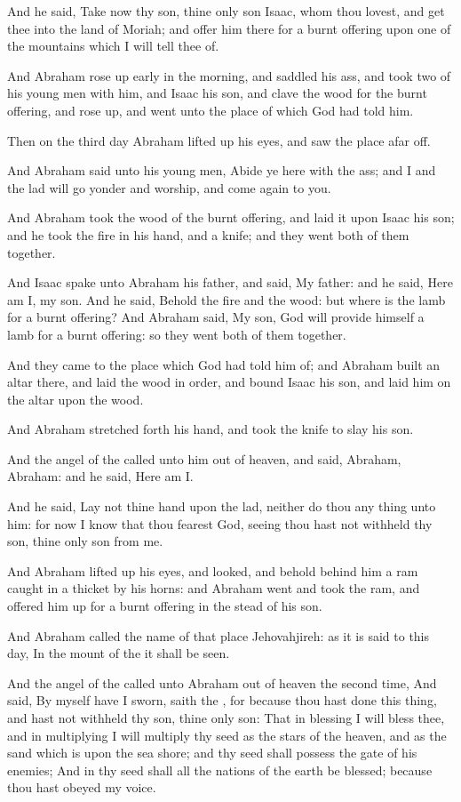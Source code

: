 \verse And he said, Take now thy son, thine only son Isaac, whom thou lovest, and get thee into the land of Moriah; and offer him there for a burnt offering upon one of the mountains which I will tell thee of.

\verse And Abraham rose up early in the morning, and saddled his ass, and took two of his young men with him, and Isaac his son, and clave the wood for the burnt offering, and rose up, and went unto the place of which God had told him.

\verse Then on the third day Abraham lifted up his eyes, and saw the place afar off.

\verse And Abraham said unto his young men, Abide ye here with the ass; and I and the lad will go yonder and worship, and come again to you.

\verse And Abraham took the wood of the burnt offering, and laid it upon Isaac his son; and he took the fire in his hand, and a knife; and they went both of them together.

\verse And Isaac spake unto Abraham his father, and said, My father: and he said, Here am I, my son. And he said, Behold the fire and the wood: but where is the lamb for a burnt offering?  \verse And Abraham said, My son, God will provide himself a lamb for a burnt offering: so they went both of them together.

\verse And they came to the place which God had told him of; and Abraham built an altar there, and laid the wood in order, and bound Isaac his son, and laid him on the altar upon the wood.

\verse And Abraham stretched forth his hand, and took the knife to slay his son.

\verse And the angel of the \LORD called unto him out of heaven, and said, Abraham, Abraham: and he said, Here am I.

\verse And he said, Lay not thine hand upon the lad, neither do thou any thing unto him: for now I know that thou fearest God, seeing thou hast not withheld thy son, thine only son from me.

\verse And Abraham lifted up his eyes, and looked, and behold behind him a ram caught in a thicket by his horns: and Abraham went and took the ram, and offered him up for a burnt offering in the stead of his son.

\verse And Abraham called the name of that place Jehovahjireh: as it is said to this day, In the mount of the \LORD it shall be seen.

\verse And the angel of the \LORD called unto Abraham out of heaven the second time, \verse And said, By myself have I sworn, saith the \LORD, for because thou hast done this thing, and hast not withheld thy son, thine only son: \verse That in blessing I will bless thee, and in multiplying I will multiply thy seed as the stars of the heaven, and as the sand which is upon the sea shore; and thy seed shall possess the gate of his enemies; \verse And in thy seed shall all the nations of the earth be blessed; because thou hast obeyed my voice.

